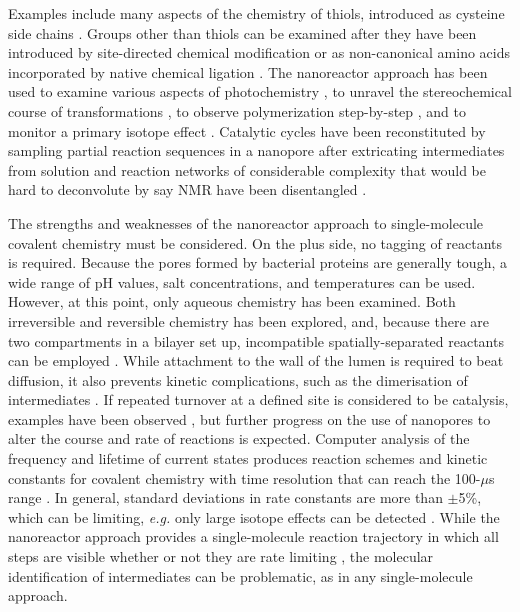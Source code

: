Examples include many aspects of the chemistry of thiols, introduced as cysteine side chains \cite{Steffensen2014}. Groups other than thiols can be examined after they have been introduced by site-directed chemical modification \cite{Ramsay2018a} or as non-canonical amino acids incorporated by native chemical ligation \cite{Lee2015}. The nanoreactor approach has been used to examine various aspects of photochemistry \cite{Luchian2003aSte}, to unravel the stereochemical course of transformations \cite{Steffensen2014}, to observe polymerization step-by-step \cite{Pulcu2019}, and to monitor a primary isotope effect \cite{Lu2010}. Catalytic cycles have been reconstituted by sampling partial reaction sequences in a nanopore after extricating intermediates from solution \cite{Ramsay2018} and reaction networks of considerable complexity that would be hard to deconvolute by say NMR have been disentangled \cite{Steffensen2014}.


The strengths and weaknesses of the nanoreactor approach to single-molecule covalent chemistry must be considered. On the plus side, no tagging of reactants is required. Because the pores formed by bacterial proteins are generally tough, a wide range of pH values, salt concentrations, and temperatures \cite{Kang2005} can be used. However, at this point, only aqueous chemistry has been examined. Both irreversible and reversible chemistry has been explored, and, because there are two compartments in a bilayer set up, incompatible spatially-separated reactants can be employed \cite{Luchian2003}. While attachment to the wall of the lumen is required to beat diffusion, it also prevents kinetic complications, such as the dimerisation of intermediates \cite{Lee2015}. If repeated turnover at a defined site is considered to be catalysis, examples have been observed \cite{Luchian2003}, but further progress on the use of nanopores to alter the course and rate of reactions is expected. Computer analysis of the frequency and lifetime of current states produces reaction schemes and kinetic constants for covalent chemistry with time resolution that can reach the 100-$\mu$s range \cite{Qing2018}. In general, standard deviations in rate constants are more than $\pm$5\%, which can be limiting, \emph{e.g.} only large isotope effects can be detected \cite{Lu2010}. While the nanoreactor approach provides a single-molecule reaction trajectory in which all steps are visible whether or not they are rate limiting \cite{Lu2010}, the molecular identification of intermediates can be problematic, as in any single-molecule approach. 


